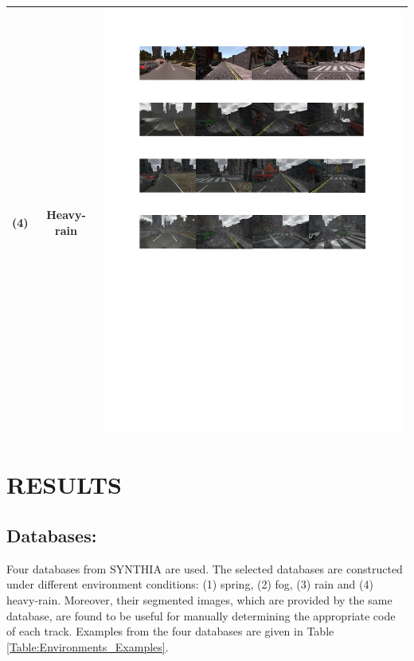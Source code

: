 \documentclass[a4paper,twoside]{article}
\begin{document}
\begin{table}[!t]
\begin{tabular}{|C{1cm}|c|C{11.5cm}|}
		(4)	& Heavy- rain & \begin{minipage}{.9\textwidth}\includegraphics[scale=.7,trim=2cm 12.5cm 2cm 14.3cm,clip]{examples.pdf}\end{minipage} \\ \hline
	\end{tabular}
\end{table}

\section{\uppercase{Results}}
\subsection{Databases:} 
Four databases from SYNTHIA \cite{Ros2016TheSYNTHIA} are used. The selected databases are constructed under different environment conditions: (1) spring, (2) fog, (3) rain and (4) heavy-rain. Moreover, their segmented images, which are provided by the same database, are found to be useful for manually determining the appropriate code of each track. Examples from the four databases are given in Table \ref{Table:Environments_Examples}.	
\end{document}
